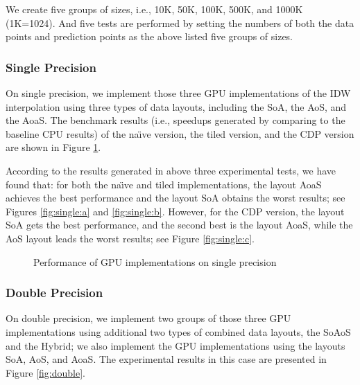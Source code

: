 We create five groups of sizes, i.e., 10K, 50K, 100K, 500K, and 1000K 
(1K=1024). And five tests are performed by setting the numbers of both the 
data points and prediction points as the above listed five groups of sizes. 


\subsubsection{Single Precision}
\label{sec:result:single}

On single precision, we implement those three GPU implementations of the IDW 
interpolation using three types of data layouts, including the SoA, the AoS, 
and the AoaS. The benchmark results (i.e., speedups generated 
by comparing to the baseline CPU results) of the na\"{\i}ve version, the 
tiled version, and the CDP version are shown in Figure \ref{fig:single}.

According to the results generated in above three experimental tests, we have found 
that: for both the na\"{\i}ve and tiled implementations, the layout AoaS 
achieves the best performance and the layout SoA obtains the worst results; 
see Figures \ref{fig:single:a} and \ref{fig:single:b}. However, for the CDP version, the layout SoA gets 
the best performance, and the second best is the layout AoaS, while the AoS 
layout leads the worst results; see Figure \ref{fig:single:c}.


\begin{figure}[htb]
\centering
{}
\hspace{1em}
\hspace{1em}
\caption{Performance of GPU implementations on single precision}
\label{fig:single}       \end{figure}


\subsubsection{Double Precision}
\label{sec:result:double}

On double precision, we implement two groups of those three GPU implementations using 
additional two types of combined data layouts, the SoAoS and the Hybrid; we 
also implement the GPU implementations using the layouts SoA, AoS, and AoaS. 
The experimental results in this case are presented in Figure \ref{fig:double}.

